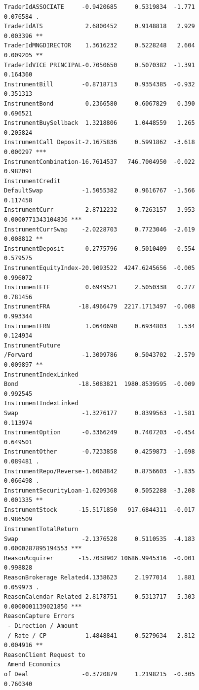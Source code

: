 \documentclass[
]{article}
\begin{document}
\begin{verbatim}
TraderIdASSOCIATE     -0.9420685     0.5319834  -1.771           0.076584 .  
TraderIdATS            2.6800452     0.9148818   2.929           0.003396 ** 
TraderIdMNGDIRECTOR    1.3616232     0.5228248   2.604           0.009205 ** 
TraderIdVICE PRINCIPAL-0.7050650     0.5070382  -1.391           0.164360    
InstrumentBill        -0.8718713     0.9354385  -0.932           0.351313    
InstrumentBond         0.2366580     0.6067829   0.390           0.696521    
InstrumentBuySellback  1.3218806     1.0448559   1.265           0.205824    
InstrumentCall Deposit-2.1675836     0.5991862  -3.618           0.000297 ***
InstrumentCombination-16.7614537   746.7004950  -0.022           0.982091    
InstrumentCredit
DefaultSwap           -1.5055382     0.9616767  -1.566           0.117458    
InstrumentCurr        -2.8712232     0.7263157  -3.953 0.0000771343104836 ***
InstrumentCurrSwap    -2.0228703     0.7723046  -2.619           0.008812 ** 
InstrumentDeposit      0.2775796     0.5010409   0.554           0.579575    
InstrumentEquityIndex-20.9093522  4247.6245656  -0.005           0.996072    
InstrumentETF          0.6949521     2.5050338   0.277           0.781456    
InstrumentFRA        -18.4966479  2217.1713497  -0.008           0.993344    
InstrumentFRN          1.0640690     0.6934803   1.534           0.124934    
InstrumentFuture
/Forward              -1.3009786     0.5043702  -2.579           0.009897 ** 
InstrumentIndexLinked
Bond                 -18.5083821  1980.8539595  -0.009           0.992545    
InstrumentIndexLinked
Swap                  -1.3276177     0.8399563  -1.581           0.113974    
InstrumentOption      -0.3366249     0.7407203  -0.454           0.649501    
InstrumentOther       -0.7233858     0.4259873  -1.698           0.089481 .  
InstrumentRepo/Reverse-1.6068842     0.8756603  -1.835           0.066498 .  
InstrumentSecurityLoan-1.6209368     0.5052288  -3.208           0.001335 ** 
InstrumentStock      -15.5171850   917.6844311  -0.017           0.986509    
InstrumentTotalReturn
Swap                  -2.1376528     0.5110535  -4.183 0.0000287895194553 ***
ReasonAcquirer       -15.7038902 10686.9945316  -0.001           0.998828    
ReasonBrokerage Related4.1338623     2.1977014   1.881           0.059973 .  
ReasonCalendar Related 2.8178751     0.5313717   5.303 0.0000001139021850 ***
ReasonCapture Errors
 - Direction / Amount
 / Rate / CP           1.4848841     0.5279634   2.812           0.004916 ** 
ReasonClient Request to
 Amend Economics 
of Deal               -0.3720879     1.2198215  -0.305           0.760340    

\end{verbatim}
\end{document}
